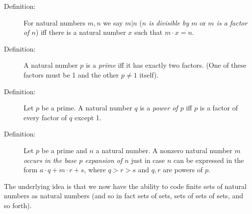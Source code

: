 \documentclass[12pt]{book}
\begin{document}
\begin{description}

\item[Definition:] For natural numbers $m,n$ we say $m|n$ ({\em $n$ is
divisible by $m$\/} or {\em $m$ is a factor of $n$\/}) iff there is a natural
number $x$ such that $m\cdot x = n$.

\item[Definition:] A natural number $p$ is a {\em prime\/} iff it has
exactly two factors.  (One of these factors must be 1 and the other $p
\neq 1$ itself).

\item[Definition:] Let $p$ be a prime.  A natural number $q$ is a {\em
power of $p$\/} iff $p$ is a factor of every factor of $q$ except 1.

\item[Definition:] Let $p$ be a prime and $n$ a natural number.  A
nonzero natural number $m$ {\em occurs in the base $p$ expansion of $n$\/}
just in case $n$ can be expressed in the form $a\cdot q+m\cdot r+s$,
where $q>r>s$ and $q,r$ are powers of $p$.

\end{description}

The underlying idea is that we now have the ability to code finite
sets of natural numbers as natural numbers (and so in fact sets of
sets, sets of sets of sets, and so forth).
\end{document}
